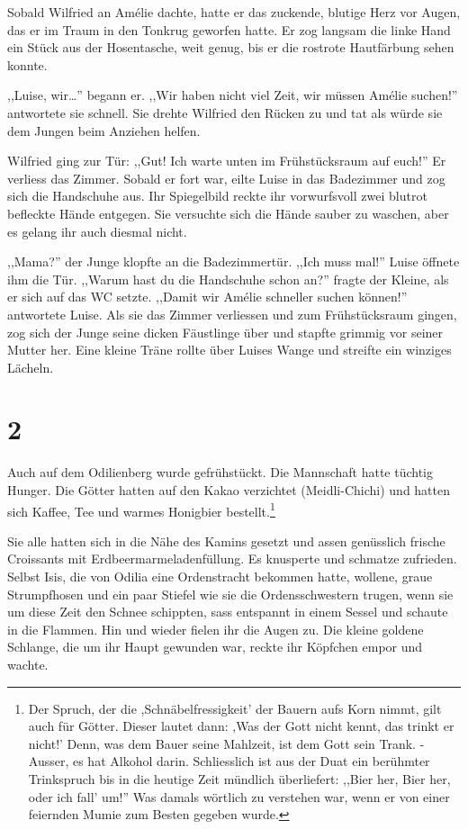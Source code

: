 \documentclass[11pt,titlepage,a5paper]{book}
\begin{document}
Sobald Wilfried an Amélie dachte, hatte er das zuckende, blutige Herz vor Augen, das er im Traum in den Tonkrug geworfen hatte. Er zog langsam die linke Hand ein Stück aus der Hosentasche, weit genug, bis er die rostrote Hautfärbung sehen konnte.

,,Luise, wir\dots '' begann er. ,,Wir haben nicht viel Zeit, wir müssen Amélie suchen!'' antwortete sie schnell. Sie drehte Wilfried den Rücken zu und tat als würde sie dem Jungen beim Anziehen helfen. 

Wilfried ging zur Tür: ,,Gut! Ich warte unten im Frühstücksraum auf euch!'' Er verliess das Zimmer. Sobald er fort war, eilte Luise in das Badezimmer und zog sich die Handschuhe aus. Ihr Spiegelbild reckte ihr vorwurfsvoll zwei blutrot befleckte Hände entgegen. Sie versuchte sich die Hände sauber zu waschen, aber es gelang ihr auch diesmal nicht. 

,,Mama?'' der Junge klopfte an die Badezimmertür. ,,Ich muss mal!'' Luise öffnete ihm die Tür. ,,Warum hast du die Handschuhe schon an?'' fragte der Kleine, als er sich auf das WC setzte. ,,Damit wir Amélie schneller suchen können!'' antwortete Luise. Als sie das Zimmer verliessen und zum Frühstücksraum gingen, zog sich der Junge seine dicken Fäustlinge über und stapfte grimmig vor seiner Mutter her. Eine kleine Träne rollte über Luises Wange und streifte ein winziges Lächeln.

\section*{2}

Auch auf dem Odilienberg wurde gefrühstückt. Die Mannschaft hatte tüchtig Hunger. Die Götter hatten auf den Kakao verzichtet (Meidli-Chichi) und hatten sich Kaffee, Tee und warmes Honigbier bestellt.\footnote{Der Spruch, der die ,Schnäbelfressigkeit' der Bauern aufs Korn nimmt, gilt auch für Götter. Dieser lautet dann: ,Was der Gott nicht kennt, das trinkt er nicht!' Denn, was dem Bauer seine Mahlzeit, ist dem Gott sein Trank. -Ausser, es hat Alkohol darin. Schliesslich ist aus der Duat ein berühmter Trinkspruch bis in die heutige Zeit mündlich überliefert: ,,Bier her, Bier her, oder ich fall' um!'' Was damals wörtlich zu verstehen war, wenn er von einer feiernden Mumie zum Besten gegeben wurde. } 

Sie alle hatten sich in die Nähe des Kamins gesetzt und assen genüsslich frische Croissants mit Erdbeermarmeladenfüllung. Es knusperte und schmatze zufrieden. Selbst Isis, die von Odilia eine Ordenstracht bekommen hatte, wollene, graue Strumpfhosen und ein paar Stiefel wie sie die Ordensschwestern trugen, wenn sie um diese Zeit den Schnee schippten, sass entspannt in einem Sessel und schaute in die Flammen. Hin und wieder fielen ihr die Augen zu. Die kleine goldene Schlange, die um ihr Haupt gewunden war, reckte ihr Köpfchen empor und wachte.
\end{document}

